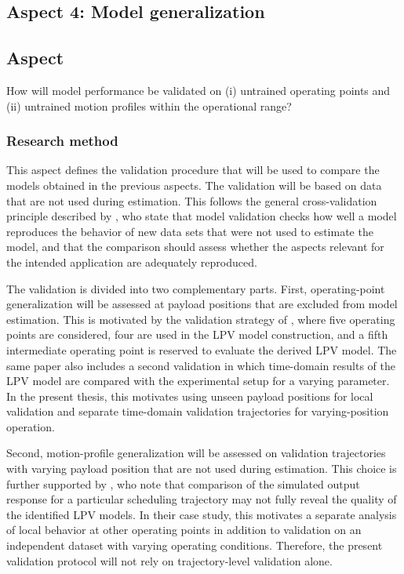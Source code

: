 \subsection{Aspect 4: Model generalization}

\subsection*{Aspect}
How will model performance be validated on (i) untrained operating points and (ii) untrained motion profiles within the operational range?

\subsubsection{Research method}

This aspect defines the validation procedure that will be used to compare the models obtained in the previous aspects. The validation will be based on data that are not used during estimation. This follows the general cross-validation principle described by \citet{schoukens2019nonlinear}, who state that model validation checks how well a model reproduces the behavior of new data sets that were not used to estimate the model, and that the comparison should assess whether the aspects relevant for the intended application are adequately reproduced.

The validation is divided into two complementary parts. First, operating-point generalization will be assessed at payload positions that are excluded from model estimation. This is motivated by the validation strategy of \citet{paijmans2008identification}, where five operating points are considered, four are used in the LPV model construction, and a fifth intermediate operating point is reserved to evaluate the derived LPV model. The same paper also includes a second validation in which time-domain results of the LPV model are compared with the experimental setup for a varying parameter. In the present thesis, this motivates using unseen payload positions for local validation and separate time-domain validation trajectories for varying-position operation.

Second, motion-profile generalization will be assessed on validation trajectories with varying payload position that are not used during estimation. This choice is further supported by \citet{bachnas2014review}, who note that comparison of the simulated output response for a particular scheduling trajectory may not fully reveal the quality of the identified LPV models. In their case study, this motivates a separate analysis of local behavior at other operating points in addition to validation on an independent dataset with varying operating conditions. Therefore, the present validation protocol will not rely on trajectory-level validation alone.

